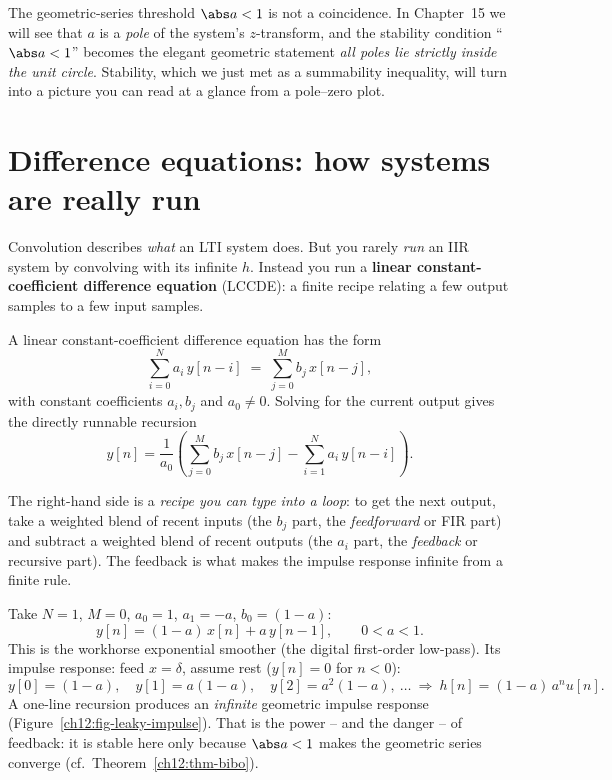 \begin{connectionbox}
The geometric-series threshold $\abs a<1$ is not a coincidence. In Chapter~15 we
will see that $a$ is a \emph{pole} of the system's $z$-transform, and the
stability condition ``$\abs a<1$'' becomes the elegant geometric statement
\emph{all poles lie strictly inside the unit circle}. Stability, which we just
met as a summability inequality, will turn into a picture you can read at a
glance from a pole--zero plot.
\end{connectionbox}

\section{Difference equations: how systems are really run}
\label{ch12:diffeq}

Convolution describes \emph{what} an LTI system does. But you rarely \emph{run}
an IIR system by convolving with its infinite $h$. Instead you run a
\textbf{linear constant-coefficient difference equation} (LCCDE): a finite recipe
relating a few output samples to a few input samples.

\begin{definition}[LCCDE]
\label{ch12:def-lccde}
A linear constant-coefficient difference equation has the form
\[
  \sum_{i=0}^{N} a_i\,y[n-i] \;=\; \sum_{j=0}^{M} b_j\,x[n-j],
\]
with constant coefficients $a_i, b_j$ and $a_0\ne0$. Solving for the current
output gives the directly runnable recursion
\[
  y[n] = \frac{1}{a_0}\left( \sum_{j=0}^{M} b_j\,x[n-j]
                            - \sum_{i=1}^{N} a_i\,y[n-i] \right).
\]
\end{definition}

The right-hand side is a \emph{recipe you can type into a loop}: to get the next
output, take a weighted blend of recent inputs (the $b_j$ part, the
\emph{feedforward} or FIR part) and subtract a weighted blend of recent outputs
(the $a_i$ part, the \emph{feedback} or recursive part). The feedback is what
makes the impulse response infinite from a finite rule.

\begin{example}
\label{ch12:leaky}
Take $N=1$, $M=0$, $a_0=1$, $a_1=-a$, $b_0=(1-a)$:
\[
  y[n] = (1-a)\,x[n] + a\,y[n-1], \qquad 0<a<1.
\]
This is the workhorse exponential smoother (the digital first-order low-pass).
Its impulse response: feed $x=\delta$, assume rest ($y[n]=0$ for $n<0$):
\[
  y[0]=(1-a),\quad y[1]=a(1-a),\quad y[2]=a^2(1-a),\ \dots\ \Rightarrow\
  h[n]=(1-a)\,a^n u[n].
\]
A one-line recursion produces an \emph{infinite} geometric impulse response
(Figure~\ref{ch12:fig-leaky-impulse}).
That is the power -- and the danger -- of feedback: it is stable here only
because $\abs a<1$ makes the geometric series converge (cf.\
Theorem~\ref{ch12:thm-bibo}).
\end{example}


